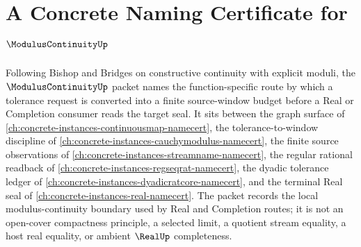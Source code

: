 \chapter{A Concrete Naming Certificate for $\ModulusContinuityUp$}
\label{ch:concrete-instances-moduluscontinuity-namecert}

Following Bishop and Bridges on constructive continuity with explicit moduli, the $\ModulusContinuityUp$ packet names the function-specific route by which a tolerance request is converted into a finite source-window budget before a Real or Completion consumer reads the target seal. It sits between the graph surface of \autoref{ch:concrete-instances-continuousmap-namecert}, the tolerance-to-window discipline of \autoref{ch:concrete-instances-cauchymodulus-namecert}, the finite source observations of \autoref{ch:concrete-instances-streamname-namecert}, the regular rational readback of \autoref{ch:concrete-instances-regseqrat-namecert}, the dyadic tolerance ledger of \autoref{ch:concrete-instances-dyadicratcore-namecert}, and the terminal Real seal of \autoref{ch:concrete-instances-real-namecert}. The packet records the local modulus-continuity boundary used by Real and Completion routes; it is not an open-cover compactness principle, a selected limit, a quotient stream equality, a host real equality, or ambient $\RealUp$ completeness.

